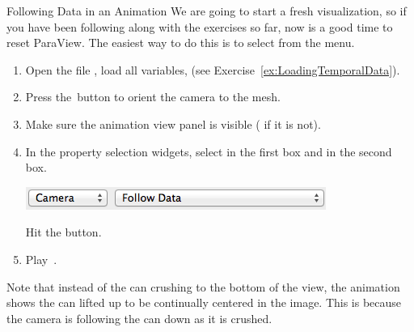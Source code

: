 \begin{exercise}{Following Data in an Animation}%
  \label{ex:FollowingDataInAnAnimation}%
  We are going to start a fresh visualization, so if you have been
  following along with the exercises so far, now is a good time to reset
  ParaView.  The easiest way to do this is to select  \ra
   from the menu.

  \begin{enumerate}
  \item Open the file , load all variables, \apply (see
    Exercise~\ref{ex:LoadingTemporalData}).
  \item Press the~\yPlus button to orient the camera to the mesh.
  \item Make sure the animation view panel is visible ( \ra
     if it is not).
  \item In the property selection widgets, select  in the first
    box and  in the second box.
    \begin{inlinefig}
      \includegraphics[height=1.5\baselineskip]{images/AddCameraFollowData}
    \end{inlinefig}
    Hit the  button.
  \item Play~\vcrPlay.
  \end{enumerate}

  Note that instead of the can crushing to the bottom of the view, the
  animation shows the can lifted up to be continually centered in the
  image. This is because the camera is following the can down as it is
  crushed.
\end{exercise}

